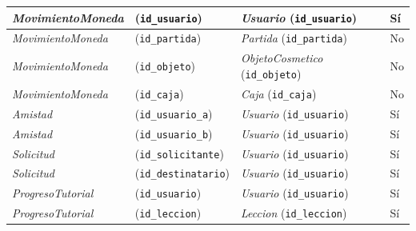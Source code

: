 \begin{center}
\begin{longtable}{|L{0.21\textwidth}|L{0.26\textwidth}|L{0.29\textwidth}|L{0.12\textwidth}|}
\textit{Movimiento\-Moneda} & (\texttt{id\_\allowbreak{}usuario}) & \textit{Usuario} (\texttt{id\_\allowbreak{}usuario}) & Sí \\ \hline
\textit{Movimiento\-Moneda} & (\texttt{id\_\allowbreak{}partida}) & \textit{Partida} (\texttt{id\_\allowbreak{}partida}) & No \\ \hline
\textit{Movimiento\-Moneda} & (\texttt{id\_\allowbreak{}objeto}) & \textit{Objeto\-Cosmetico} (\texttt{id\_\allowbreak{}objeto}) & No \\ \hline
\textit{Movimiento\-Moneda} & (\texttt{id\_\allowbreak{}caja}) & \textit{Caja} (\texttt{id\_\allowbreak{}caja}) & No \\ \hline
\textit{Amistad} & (\texttt{id\_\allowbreak{}usuario\_\allowbreak{}a}) & \textit{Usuario} (\texttt{id\_\allowbreak{}usuario}) & Sí \\ \hline
\textit{Amistad} & (\texttt{id\_\allowbreak{}usuario\_\allowbreak{}b}) & \textit{Usuario} (\texttt{id\_\allowbreak{}usuario}) & Sí \\ \hline
\textit{Solicitud} & (\texttt{id\_\allowbreak{}solicitante}) & \textit{Usuario} (\texttt{id\_\allowbreak{}usuario}) & Sí \\ \hline
\textit{Solicitud} & (\texttt{id\_\allowbreak{}destinatario}) & \textit{Usuario} (\texttt{id\_\allowbreak{}usuario}) & Sí \\ \hline
\textit{Progreso\-Tutorial} & (\texttt{id\_\allowbreak{}usuario}) & \textit{Usuario} (\texttt{id\_\allowbreak{}usuario}) & Sí \\ \hline
\textit{Progreso\-Tutorial} & (\texttt{id\_\allowbreak{}leccion}) & \textit{Leccion} (\texttt{id\_\allowbreak{}leccion}) & Sí \\ \hline
\end{longtable}
\end{center}
